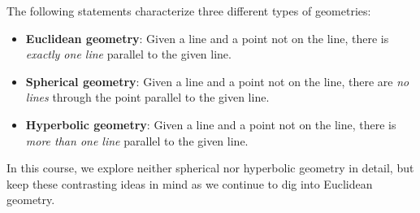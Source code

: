 The following statements characterize three different types of geometries:  
\begin{itemize}
\item \textbf{Euclidean geometry}: Given a line and a point not on the line, there is \emph{exactly one line} parallel to the given line.

\item \textbf{Spherical geometry}:  Given a line and a point not on the line, there are \emph{no lines} through the point parallel to the given line. 

\item \textbf{Hyperbolic geometry}:  Given a line and a point not on the line, there is \emph{more than one line} parallel to the given line. 
\end{itemize}



In this course, we explore neither spherical nor hyperbolic geometry in detail, but keep these contrasting ideas in mind as we continue to dig into Euclidean geometry.  

